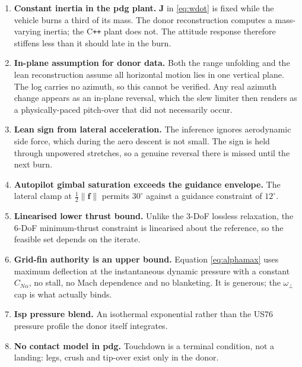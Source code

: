 \documentclass[11pt,a4paper]{article}
\newcommand{\vect}[1]{\mathbf{#1}}
\begin{document}
\begin{enumerate}
\item \textbf{Constant inertia in the pdg plant.} $\vect{J}$ in
  \eqref{eq:wdot} is fixed while the vehicle burns a third of its mass. The
  donor reconstruction computes a mass-varying inertia; the C\texttt{++} plant
  does not. The attitude response therefore stiffens less than it should late in
  the burn.

\item \textbf{In-plane assumption for donor data.} Both the range unfolding and
  the lean reconstruction assume all horizontal motion lies in one vertical
  plane. The log carries no azimuth, so this cannot be verified. Any real
  azimuth change appears as an in-plane reversal, which the slew limiter then
  renders as a physically-paced pitch-over that did not necessarily occur.

\item \textbf{Lean sign from lateral acceleration.} The inference ignores
  aerodynamic side force, which during the aero descent is not small. The sign is
  held through unpowered stretches, so a genuine reversal there is missed until
  the next burn.

\item \textbf{Autopilot gimbal saturation exceeds the guidance envelope.} The
  lateral clamp at $\tfrac{1}{2}\lVert\vect{f}\rVert$ permits $30^\circ$ against
  a guidance constraint of $12^\circ$.

\item \textbf{Linearised lower thrust bound.} Unlike the 3-DoF lossless
  relaxation, the 6-DoF minimum-thrust constraint is linearised about the
  reference, so the feasible set depends on the iterate.

\item \textbf{Grid-fin authority is an upper bound.} Equation
  \eqref{eq:alphamax} uses maximum deflection at the instantaneous dynamic
  pressure with a constant $C_{N\alpha}$, no stall, no Mach dependence and no
  blanketing. It is generous; the $\omega_\perp$ cap is what actually binds.

\item \textbf{Isp pressure blend.} An isothermal exponential rather than the
  US76 pressure profile the donor itself integrates.

\item \textbf{No contact model in pdg.} Touchdown is a terminal condition, not a
  landing: legs, crush and tip-over exist only in the donor.


\end{enumerate}
\end{document}
